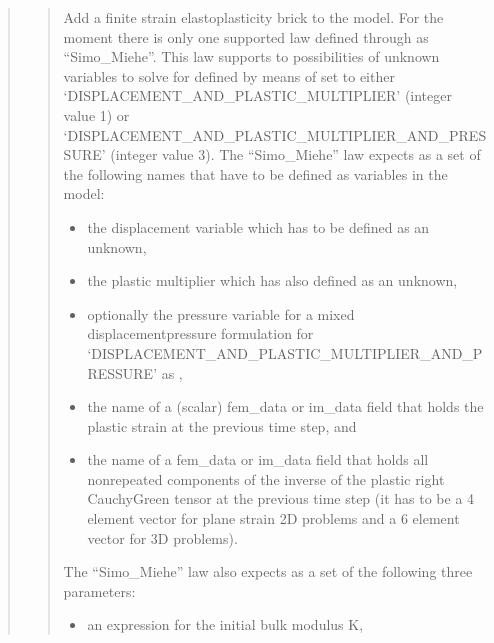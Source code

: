 \documentclass[a4paper,11pt,english]{sphinxmanual}
\begin{document}
\begin{quote}
\sphinxAtStartPar
{}
\begin{quote}

\sphinxAtStartPar
Add a finite strain elastoplasticity brick to the model.
For the moment there is only one supported law defined through
 as “Simo\_Miehe”.
This law supports to possibilities of unknown variables to solve for
defined by means of  set to either
‘DISPLACEMENT\_AND\_PLASTIC\_MULTIPLIER’ (integer value 1) or
‘DISPLACEMENT\_AND\_PLASTIC\_MULTIPLIER\_AND\_PRESSURE’ (integer value 3).
The  “Simo\_Miehe” law expects as  a set of the
following names that have to be defined as variables in the model:
\begin{itemize}
\item {} 
\sphinxAtStartPar
the displacement variable which has to be defined as an unknown,

\item {} 
\sphinxAtStartPar
the plastic multiplier which has also defined as an unknown,

\item {} 
\sphinxAtStartPar
optionally the pressure variable for a mixed displacement\sphinxhyphen{}pressure
formulation for ‘DISPLACEMENT\_AND\_PLASTIC\_MULTIPLIER\_AND\_PRESSURE’
as ,

\item {} 
\sphinxAtStartPar
the name of a (scalar) fem\_data or im\_data field that holds the
plastic strain at the previous time step, and

\item {} 
\sphinxAtStartPar
the name of a fem\_data or im\_data field that holds all
non\sphinxhyphen{}repeated components of the inverse of the plastic right
Cauchy\sphinxhyphen{}Green tensor at the previous time step
(it has to be a 4 element vector for plane strain 2D problems
and a 6 element vector for 3D problems).

\end{itemize}

\sphinxAtStartPar
The  “Simo\_Miehe” law also expects as  a set of the
following three parameters:
\begin{itemize}
\item {} 
\sphinxAtStartPar
an expression for the initial bulk modulus K,


\end{itemize}
\end{quote}
\end{quote}
\end{document}
